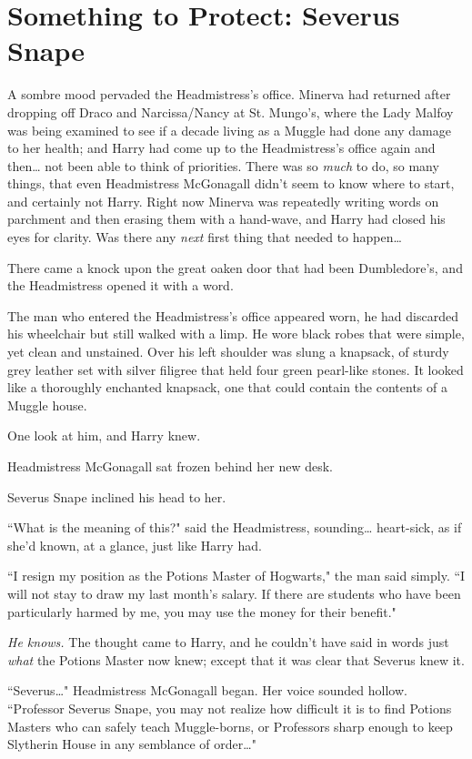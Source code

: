 \chapter{Something to Protect: Severus Snape}

\lettrine{A}{} sombre mood pervaded the Headmistress's office. Minerva had returned after dropping off Draco and Narcissa/Nancy at St. Mungo's, where the Lady Malfoy was being examined to see if a decade living as a Muggle had done any damage to her health; and Harry had come up to the Headmistress's office again and then{\ldots} not been able to think of priorities. There was so \emph{much} to do, so many things, that even Headmistress McGonagall didn't seem to know where to start, and certainly not Harry. Right now Minerva was repeatedly writing words on parchment and then erasing them with a hand-wave, and Harry had closed his eyes for clarity. Was there any \emph{next} first thing that needed to happen{\ldots}

There came a knock upon the great oaken door that had been Dumbledore's, and the Headmistress opened it with a word.

The man who entered the Headmistress's office appeared worn, he had discarded his wheelchair but still walked with a limp. He wore black robes that were simple, yet clean and unstained. Over his left shoulder was slung a knapsack, of sturdy grey leather set with silver filigree that held four green pearl-like stones. It looked like a thoroughly enchanted knapsack, one that could contain the contents of a Muggle house.

One look at him, and Harry knew.

Headmistress McGonagall sat frozen behind her new desk.

Severus Snape inclined his head to her.

``What is the meaning of this?" said the Headmistress, sounding{\ldots} heart-sick, as if she'd known, at a glance, just like Harry had.

``I resign my position as the Potions Master of Hogwarts," the man said simply. ``I will not stay to draw my last month's salary. If there are students who have been particularly harmed by me, you may use the money for their benefit."

\emph{He knows.} The thought came to Harry, and he couldn't have said in words just \emph{what} the Potions Master now knew; except that it was clear that Severus knew it.

``Severus{\ldots}" Headmistress McGonagall began. Her voice sounded hollow. ``Professor Severus Snape, you may not realize how difficult it is to find Potions Masters who can safely teach Muggle-borns, or Professors sharp enough to keep Slytherin House in any semblance of order{\ldots}"

